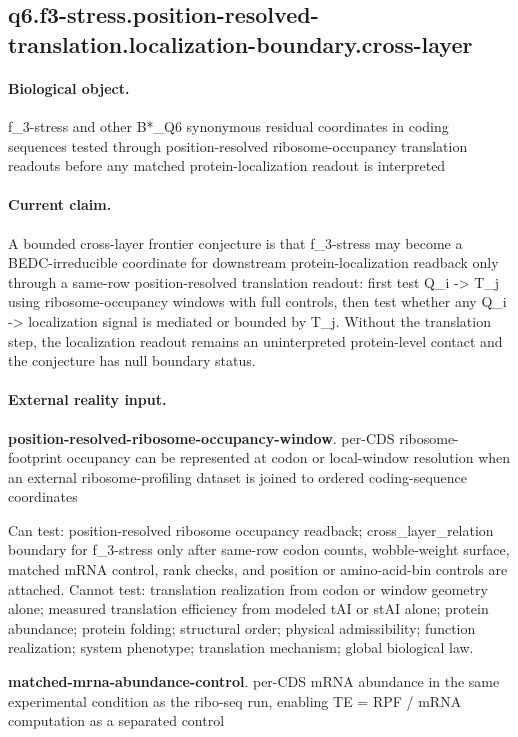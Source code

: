 \subsection{q6.f3-stress.position-resolved-translation.localization-boundary.cross-layer}

\paragraph{Biological object.} f\_3-stress and other B*\_Q6 synonymous residual coordinates in coding sequences tested through position-resolved ribosome-occupancy translation readouts before any matched protein-localization readout is interpreted

\paragraph{Current claim.} A bounded cross-layer frontier conjecture is that f\_3-stress may become a BEDC-irreducible coordinate for downstream protein-localization readback only through a same-row position-resolved translation readout: first test Q\_i -> T\_j using ribosome-occupancy windows with full controls, then test whether any Q\_i -> localization signal is mediated or bounded by T\_j. Without the translation step, the localization readout remains an uninterpreted protein-level contact and the conjecture has null boundary status.

\paragraph{External reality input.}
\textbf{position-resolved-ribosome-occupancy-window}. per-CDS ribosome-footprint occupancy can be represented at codon or local-window resolution when an external ribosome-profiling dataset is joined to ordered coding-sequence coordinates

Can test: position-resolved ribosome occupancy readback; cross\_layer\_relation boundary for f\_3-stress only after same-row codon counts, wobble-weight surface, matched mRNA control, rank checks, and position or amino-acid-bin controls are attached. Cannot test: translation realization from codon or window geometry alone; measured translation efficiency from modeled tAI or stAI alone; protein abundance; protein folding; structural order; physical admissibility; function realization; system phenotype; translation mechanism; global biological law.

\textbf{matched-mrna-abundance-control}. per-CDS mRNA abundance in the same experimental condition as the ribo-seq run, enabling TE = RPF / mRNA computation as a separated control


